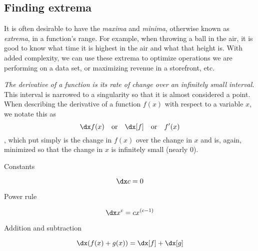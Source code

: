 \subsection{Finding extrema}

It is often desirable to have the \emph{maxima} and \emph{minima}, otherwise known as \emph{extrema}, in a function's range. For example, when throwing a ball in the air, it is good to know what time it is highest in the air and what that height is. With added complexity, we can use these extrema to optimize operations we are performing on a data set, or maximizing revenue in a storefront, etc.


\emph{The derivative of a function is its rate of change over an infinitely small interval.} This interval is narrowed to a singularity so that it is almost considered a point. When describing the derivative of a function $f(x)$ with respect to a variable $x$, we notate this as
\begin{equation*}
    \dx f(x) \quad \text{or} \quad \dx[f] \quad \text{or} \quad f'(x)
\end{equation*}, which put simply is the change in $f(x)$ over the change in $x$ and is, again, minimized so that the change in $x$ is infinitely small (nearly 0).


\begin{psec}{Constants}

    \begin{equation}\label{eq:derivative constant}
        \dx c = 0
    \end{equation}

\end{psec}

\begin{psec}{Power rule}

    \begin{equation}\label{eq:derivative power}
        \dx x^c = c x^{(c - 1)}
    \end{equation}

\end{psec}

\begin{psec}{Addition and subtraction}

    \begin{equation}\label{eq:derivative add}
        \dx (f(x) + g(x)) = \dx[f] + \dx[g]
    \end{equation}

\end{psec}

